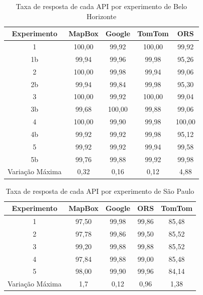 \begin{table}[!ht]
    \centering
    \caption{Taxa de resposta de cada API por experimento de Belo Horizonte}
    \label{tab:txRespExpAPIBH}
    \begin{adjustbox}{width=0.7\textwidth}
    \begin{tabular}{|c|c|c|c|c|}
    \hline
    Experimento & MapBox & Google & TomTom & ORS\\
    \hline
    1 & 100,00 & 99,92 & 100,00 & 99,92\\
    \hline
    1b & 99,94 & 99,96 & 99,98 & 95,26 \\
    \hline
    2 & 100,00 & 99,98 & 99,94 & 99,06\\
    \hline
    2b & 99,94 & 99,84 & 99,98 & 95,30\\
    \hline
    3 & 100,00 & 99,92 & 100,00 & 99,04\\
    \hline
    3b & 99,68 & 100,00 & 99,88 & 99,06\\
    \hline
    4 & 100,00 & 99,90 & 99,98 & 100,00\\
    \hline
    4b & 99,92 & 99,92 & 99,98 & 95,12\\
    \hline
    5 & 99,92 & 99,92 & 99,94 & 99,58\\
    \hline
    5b & 99,76 & 99,88 & 99,92 & 99,98\\
    \hline
    Variação Máxima & 0,32 & 0,16 & 0,12 & 4,88\\
    \hline
    \end{tabular}
    \end{adjustbox}
\end{table}

\begin{table}[!ht]
    \centering
    \caption{Taxa de resposta de cada API por experimento de São Paulo}
    \label{tab:txRespExpAPISP}
    \begin{adjustbox}{width=0.7\textwidth}
    \begin{tabular}{|c|c|c|c|c|}
    \hline
    Experimento & MapBox & Google & ORS & TomTom\\
    \hline
    1 & 97,50 & 99,98 & 99,86 & 85,48\\
    \hline
    2 & 97,78 & 99,86 & 99,50 & 85,52\\
    \hline
    3 & 99,20 & 99,88 & 99,88 & 85,52\\
    \hline
    4 & 97,84 & 99,88 & 99,00 & 85,48\\
    \hline
    5 & 98,00 & 99,90 & 99,96 & 84,14\\
    \hline
    Variação Máxima & 1,7 & 0,12 & 0,96 & 1,38\\
    \hline
    \end{tabular}
    \end{adjustbox}
\end{table}

